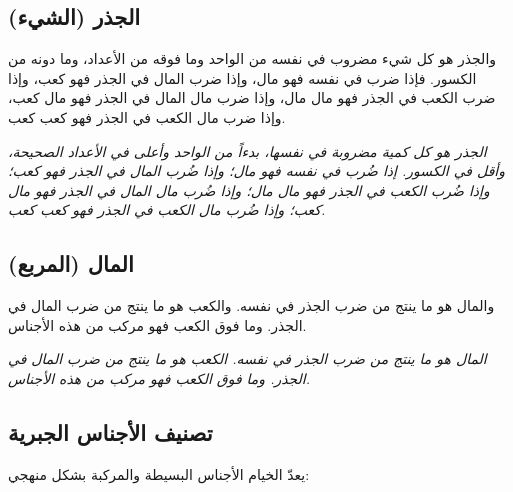 \documentclass[11pt,a4paper]{book}
\newcommand{\ar}[1]{\leavevmode\arabicfont\beginR #1\endR}
\begin{document}
\subsection{\ar{الجذر (الشيء)}}

\ar{والجذر هو كل شيء مضروب في نفسه من الواحد وما فوقه من الأعداد، وما دونه من الكسور. فإذا ضرب في نفسه فهو مال، وإذا ضرب المال في الجذر فهو كعب، وإذا ضرب الكعب في الجذر فهو مال مال، وإذا ضرب مال المال في الجذر فهو مال كعب، وإذا ضرب مال الكعب في الجذر فهو كعب كعب.}

\vspace{0.3cm}

\textit{الجذر هو كل كمية مضروبة في نفسها، بدءاً من الواحد وأعلى في الأعداد الصحيحة، وأقل في الكسور. إذا ضُرب في نفسه فهو مال؛ وإذا ضُرب المال في الجذر فهو كعب؛ وإذا ضُرب الكعب في الجذر فهو مال مال؛ وإذا ضُرب مال المال في الجذر فهو مال كعب؛ وإذا ضُرب مال الكعب في الجذر فهو كعب كعب.}

\subsection{\ar{المال (المربع)}}

\ar{والمال هو ما ينتج من ضرب الجذر في نفسه. والكعب هو ما ينتج من ضرب المال في الجذر. وما فوق الكعب فهو مركب من هذه الأجناس.}

\vspace{0.3cm}

\textit{المال هو ما ينتج من ضرب الجذر في نفسه. الكعب هو ما ينتج من ضرب المال في الجذر. وما فوق الكعب فهو مركب من هذه الأجناس.}

\subsection{\ar{تصنيف الأجناس الجبرية}}

\ar{يعدّ الخيام الأجناس البسيطة والمركبة بشكل منهجي:}
\end{document}
